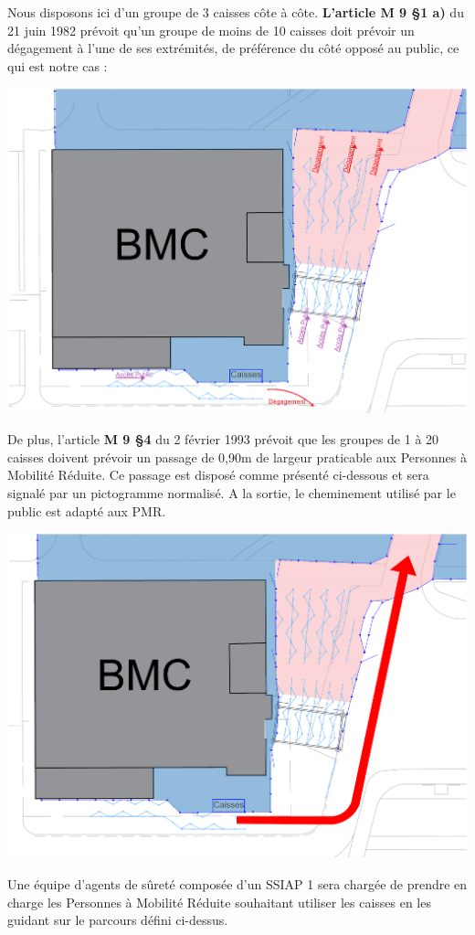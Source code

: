 \documentclass[hidelinks, paper=a4, fontsize=13pt]{report}
\begin{document}
Nous disposons ici d’un groupe de 3 caisses côte à côte. \textbf{L’article M 9 §1 a)} du 21 juin 1982 prévoit qu’un groupe de moins de 10 caisses doit prévoir un dégagement à l’une de ses extrémités, de préférence du côté opposé au public, ce qui est notre cas :
\begin{center}
	\includegraphics[width=.8\textwidth,keepaspectratio]{Exports/Plan_24h_45eme-Entree_Degagements}
\end{center}
De plus, l’article \textbf{M 9 §4 }du 2 février 1993 prévoit que les groupes de 1 à 20 caisses doivent prévoir un passage de 0,90m de largeur praticable aux Personnes à Mobilité Réduite. Ce passage est disposé comme présenté ci-dessous et sera signalé par un pictogramme normalisé. A la sortie, le cheminement utilisé par le public est adapté aux PMR. 

\begin{center}
	\includegraphics[width=.6\textwidth,keepaspectratio]{Exports/Plan_24h_45eme-Entree_PMR}
\end{center}


Une équipe d’agents de sûreté composée d’un SSIAP 1 sera chargée de prendre en charge les Personnes à Mobilité Réduite souhaitant utiliser les caisses en les guidant sur le parcours défini ci-dessus. 
\newpage
\end{document}
